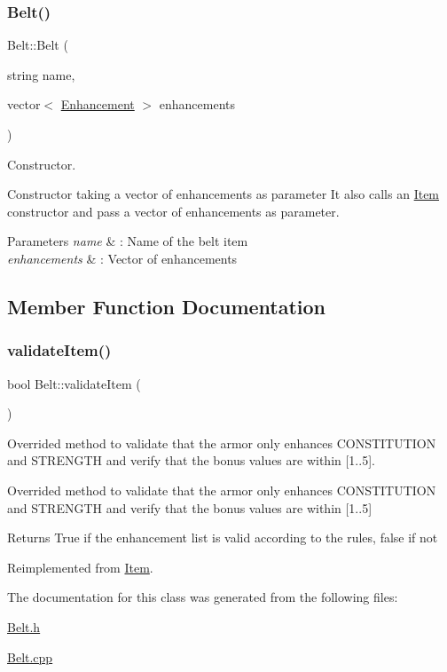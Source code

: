 \subsubsection{\texorpdfstring{Belt()}{Belt()}\hspace{0.1cm}{\footnotesize\ttfamily [2/2]}}
{\footnotesize\ttfamily Belt\+::\+Belt (\begin{DoxyParamCaption}\item[{string}]{name,  }\item[{vector$<$ \hyperlink{class_enhancement}{Enhancement} $>$}]{enhancements }\end{DoxyParamCaption})}



Constructor. 

Constructor taking a vector of enhancements as parameter It also calls an \hyperlink{class_item}{Item} constructor and pass a vector of enhancements as parameter. 
\begin{DoxyParams}{Parameters}
{\em name} & \+: Name of the belt item \\
\hline
{\em enhancements} & \+: Vector of enhancements \\
\hline
\end{DoxyParams}


\subsection{Member Function Documentation}
\hypertarget{class_belt_ab374477dd9d966e6e6b81b3699afd939}{}\label{class_belt_ab374477dd9d966e6e6b81b3699afd939} 
\subsubsection{\texorpdfstring{validate\+Item()}{validateItem()}}
{\footnotesize\ttfamily bool Belt\+::validate\+Item (\begin{DoxyParamCaption}{ }\end{DoxyParamCaption})\hspace{0.3cm}{\ttfamily [virtual]}}



Overrided method to validate that the armor only enhances \textquotesingle{}C\+O\+N\+S\+T\+I\+T\+U\+T\+I\+ON\textquotesingle{} and \textquotesingle{}S\+T\+R\+E\+N\+G\+TH\textquotesingle{} and verify that the bonus values are within \mbox{[}1..5\mbox{]}. 

Overrided method to validate that the armor only enhances \textquotesingle{}C\+O\+N\+S\+T\+I\+T\+U\+T\+I\+ON\textquotesingle{} and \textquotesingle{}S\+T\+R\+E\+N\+G\+TH\textquotesingle{} and verify that the bonus values are within \mbox{[}1..5\mbox{]} \begin{DoxyReturn}{Returns}
True if the enhancement list is valid according to the rules, false if not 
\end{DoxyReturn}


Reimplemented from \hyperlink{class_item_a6603371b60aaded48f697975c81fc25b}{Item}.



The documentation for this class was generated from the following files\+:\begin{DoxyCompactItemize}
\item 
\hyperlink{_belt_8h}{Belt.\+h}\item 
\hyperlink{_belt_8cpp}{Belt.\+cpp}\end{DoxyCompactItemize}
